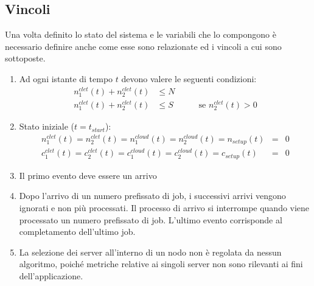 \subsection{Vincoli}
Una volta definito lo stato del sistema e le variabili che lo compongono è
necessario definire anche come esse sono relazionate ed i vincoli a cui sono
sottoposte.
\begin{enumerate}
\item Ad ogni istante di tempo $t$ devono valere le seguenti condizioni:
\begin{eqnarray*}
n_1^{clet}(t) + n_2^{clet}(t) & \leq N & \\
n_1^{clet}(t) + n_2^{clet}(t) & \leq S & \qquad \textrm{se } n_2^{clet}(t) > 0
\end{eqnarray*}
\item Stato iniziale ($t=t_{start}$):
\begin{eqnarray*}
n_1^{clet}(t) = n_2^{clet}(t) = n_1^{cloud}(t) = n_2^{cloud}(t) = n_{setup}(t) &=& 0 
\\
c_1^{clet}(t) = c_2^{clet}(t) = c_1^{cloud}(t) = c_2^{cloud}(t) = c_{setup}(t) &=& 0
\end{eqnarray*}
\item Il primo evento deve essere un arrivo
\item Dopo l’arrivo di un numero prefissato di job, i successivi arrivi vengono
ignorati e non più processati.  Il processo di arrivo si interrompe quando viene
processato un numero prefissato di job.  L’ultimo evento corrisponde al
completamento dell’ultimo job.
\item La selezione dei server all’interno di un nodo non è regolata da nessun
algoritmo, poiché metriche relative ai singoli server non sono rilevanti ai fini
dell’applicazione.  
\end{enumerate}
%
%
